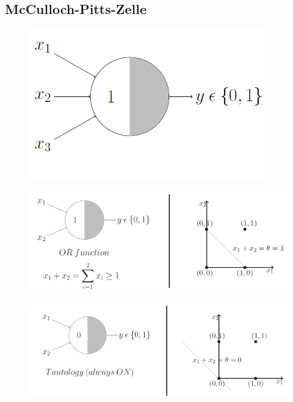 \subsection{McCulloch-Pitts-Zelle} \label{ap:sc:mpz} %

\begin{figure}[!htb]
	\centering
	\includegraphics[width=.5\linewidth]{img/mpn_or2}
	\label{fig:mpn_or2}
\end{figure}

\begin{figure}[!htb]
	\centering
	\includegraphics[width=\linewidth]{img/mpn_or3}
	\label{fig:mpn_or3}
\end{figure}

\begin{figure}[!htb]
	\centering
	\includegraphics[width=\linewidth]{img/mpn_tautology}
	\label{fig:mpn_tautology}
\end{figure}



